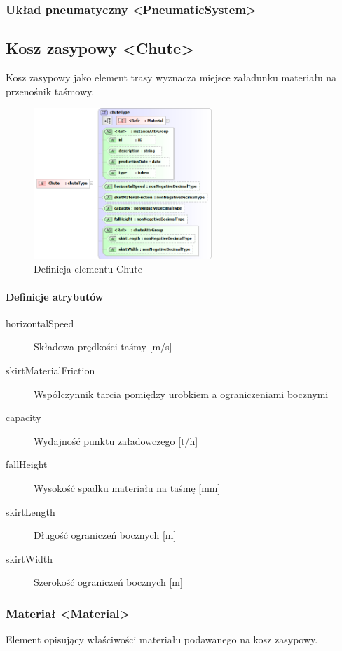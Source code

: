 \documentclass[12pt,a4paper]{article}
\begin{document}
\subsubsection{Układ pneumatyczny <PneumaticSystem>}


\subsection{Kosz zasypowy <Chute>}
Kosz zasypowy jako element trasy wyznacza miejsce załadunku materiału na przenośnik taśmowy.

\begin{figure}[h]
  \centering
  \includegraphics[width=0.6\textwidth]{png/liquid/Chute}
  \caption{Definicja elementu Chute}
  \label{fig:chute-xsd}
\end{figure}

\paragraph{Definicje atrybutów}
\begin{description}
\item[horizontalSpeed] Składowa prędkości taśmy [m/s]
\item[skirtMaterialFriction] Współczynnik tarcia pomiędzy urobkiem a ograniczeniami bocznymi
\item[capacity] Wydajność punktu załadowczego [t/h]
\item[fallHeight] Wysokość spadku materiału na taśmę [mm]
\item[skirtLength] Długość ograniczeń bocznych [m]
\item[skirtWidth] Szerokość ograniczeń bocznych [m]
\end{description}


\subsubsection{Materiał <Material>}
Element opisujący właściwości materiału podawanego na kosz zasypowy.
\end{document}
